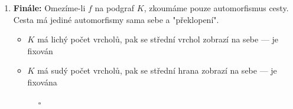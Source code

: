 \documentclass[12pt]{article}
\begin{document}
\begin{enumerate}
\begin{enumerate}
      \item \textbf{Finále:}
      Omezíme-li $f$ na podgraf $K$, zkoumáme pouze automorfismus cesty. Cesta má jediné automorfismy sama sebe a "překlopení".
      \begin{itemize}
          \item $K$ má lichý počet vrcholů, pak se střední vrchol zobrazí na sebe --- je fixován
          \item $K$ má sudý počet vrcholů, pak se střední hrana zobrazí na sebe --- je fixována
      \end{itemize}
      $\quad\quad\quad\square$
  \end{enumerate}

\end{enumerate}
\end{document}
